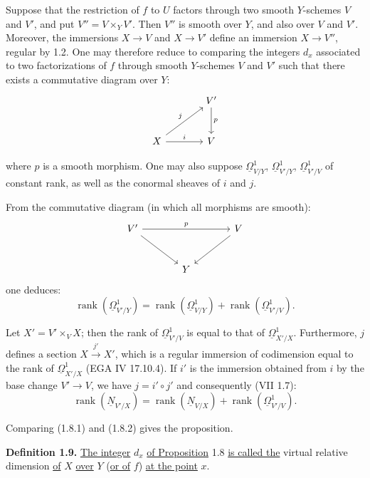 Suppose that the restriction of $f$ to $U$ factors through two smooth $Y$-schemes $V$ and $V'$, and put $V''=V\times_Y V'$. Then $V''$ is smooth over $Y$, and also over $V$ and $V'$. Moreover, the immersions $X\to V$ and $X\to V'$ define an immersion $X\to V''$, regular by 1.2. One may therefore reduce to comparing the integers $d_x$ associated to two factorizations of $f$ through smooth $Y$-schemes $V$ and $V'$ such that there exists a commutative diagram over $Y$:
\[
\begin{tikzcd}[column sep=large,row sep=large]
& V' \arrow[d,"p"]\\
X \arrow[ur,"j"] \arrow[r,"i"] & V
\end{tikzcd}
\]

%
where $p$ is a
smooth morphism. One may also suppose $\underline{\Omega}^1_{V/Y}$, $\underline{\Omega}^1_{V'/Y}$, $\underline{\Omega}^1_{V'/V}$ of constant rank, as well as the conormal sheaves of $i$ and $j$.

From the commutative diagram (in which all morphisms are smooth):
\[
\begin{tikzcd}[column sep=large,row sep=large]
V' \arrow[rr,"p"] \arrow[dr] && V \arrow[dl]\\
& Y &
\end{tikzcd}
\]
one deduces:
\begin{equation}\tag{1.8.1}
\operatorname{rank}(\underline{\Omega}^1_{V'/Y})=
\operatorname{rank}(\underline{\Omega}^1_{V/Y})+
\operatorname{rank}(\underline{\Omega}^1_{V'/V}).
\end{equation}

Let $X'=V'\times_V X$; then the rank of $\underline{\Omega}^1_{V'/V}$ is equal to that of $\underline{\Omega}^1_{X'/X}$. Furthermore, $j$ defines a section $X\xrightarrow{j'} X'$, which is a regular immersion of codimension equal to the rank of $\underline{\Omega}^1_{X'/X}$ (EGA IV 17.10.4). If $i'$ is the immersion obtained from $i$ by the base change $V'\to V$, we have $j=i'\circ j'$ and consequently (VII 1.7):
\begin{equation}\tag{1.8.2}
\operatorname{rank}(\underline{N}_{V'/X})=
\operatorname{rank}(\underline{N}_{V/X})+
\operatorname{rank}(\underline{\Omega}^1_{V'/V}).
\end{equation}

Comparing (1.8.1) and (1.8.2) gives the proposition.

\textbf{Definition 1.9.} \uline{The integer} $d_x$ \uline{of Proposition} 1.8 \uline{is called the} virtual relative dimension \uline{of} $X$ \uline{over} $Y$ (\uline{or of} $f$) \uline{at the point} $x$.

